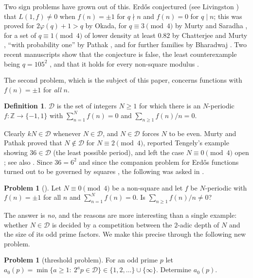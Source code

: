 \documentclass[11pt,a4paper]{article}
\theoremstyle{definition}
\newtheorem{definition}[theorem]{Definition}
\newtheorem{problem}[theorem]{Problem}
\theoremstyle{remark}
\newcommand{\Z}{\mathbb{Z}}
\newcommand{\cD}{\mathcal{D}}
\begin{document}
Two sign problems have grown out of this. Erd\H{o}s conjectured (see Livingston \cite{Liv65}) that $L(1,f)\neq0$ when $f(n)=\pm1$ for $q\nmid n$ and $f(n)=0$ for $q\mid n$; this was proved for $2\varphi(q)+1>q$ by Okada, for $q\equiv3\pmod4$ by Murty and Saradha \cite{MS10}, for a set of $q\equiv1\pmod 4$ of lower density at least $0.82$ by Chatterjee and Murty \cite{CM15}, ``with probability one'' by Pathak \cite{Pat19}, and for further families by Bharadwaj \cite{Bha22}. Two recent manuscripts show that the conjecture is false, the least counterexample being $q=105^2$ \cite{Kei26a}, and that it holds for every non-square modulus \cite{Kei26c}.

The second problem, which is the subject of this paper, concerns functions with $f(n)=\pm1$ for \emph{all} $n$.

\begin{definition}\label{def:D}
$\cD$ is the set of integers $N\ge1$ for which there is an $N$-periodic $f\colon\Z\to\{-1,1\}$ with $\sum_{n=1}^Nf(n)=0$ and $\sum_{n\ge1}f(n)/n=0$.
\end{definition}

Clearly $kN\in\cD$ whenever $N\in\cD$, and $N\in\cD$ forces $N$ to be even. Murty and Pathak \cite{MP22} proved that $N\notin\cD$ for $N\equiv2\pmod4$, reported Tengely's example showing $36\in\cD$ (the least possible period), and left the case $N\equiv0\pmod4$ open \cite{MP22}; see also \cite[Sect.~6]{Kei26c}. Since $36=6^2$ and since the companion problem for Erd\H{o}s functions turned out to be governed by squares \cite{Kei26a,Kei26c}, the following was asked in \cite[Sect.~6]{Kei26c}.

\begin{problem}[{\cite[Sect.~6]{Kei26c}}]\label{prob:nonsquare}
Let $N\equiv0\pmod4$ be a non-square and let $f$ be $N$-periodic with $f(n)=\pm1$ for all $n$ and $\sum_{n=1}^Nf(n)=0$. Is $\sum_{n\ge1}f(n)/n\neq0$?
\end{problem}

The answer is \emph{no}, and the reasons are more interesting than a single example: whether $N\in\cD$ is decided by a competition between the $2$-adic depth of $N$ and the size of its odd prime factors. We make this precise through the following new problem.

\begin{problem}[threshold problem]\label{prob:threshold}
For an odd prime $p$ let $a_0(p)=\min\{a\ge1:\ 2^ap\in\cD\}\in\{1,2,\dots\}\cup\{\infty\}$. Determine $a_0(p)$.
\end{problem}
\end{document}
